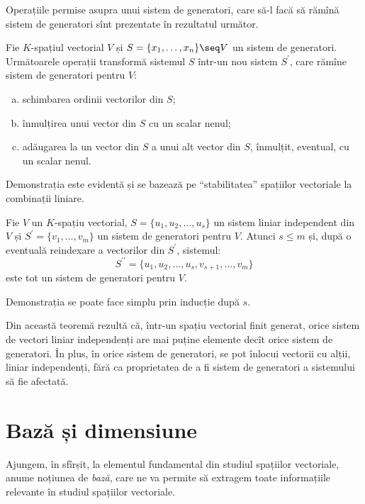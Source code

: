 Operațiile permise asupra unui sistem de generatori, care să-l facă să rămînă 
sistem de generatori sînt prezentate în rezultatul următor.

\begin{proposition}
Fie $K$-spațiul vectorial $V$ și $S = \{x_1, \dots, x_n\} \seq V$ un 
sistem de generatori. Următoarele operații transformă sistemul $S$ într-un nou 
sistem $S^{\prime}$, care rămîne sistem de generatori pentru $V$:
\begin{enumerate}[(a)]
\item schimbarea ordinii vectorilor din $S$;
\item înmulțirea unui vector din $S$ cu un scalar nenul;
\item adăugarea la un vector din $S$ a unui alt vector din $S$, înmulțit, 
eventual, cu un scalar nenul.
\end{enumerate}
\end{proposition}

Demonstrația este evidentă și se bazează pe \enquote{stabilitatea} spațiilor 
vectoriale la combinații liniare.

\begin{theorem}
Fie $V$ un $K$-spațiu vectorial, $S = \{u_1, u_2, \dots, u_s\}$ un sistem 
liniar independent din $V$ și $S^{\prime} = \{v_1, \dots, v_m\}$ un sistem de 
generatori pentru $V$. Atunci $s \leq m$ și, după o eventuală reindexare a 
vectorilor din $S^{\prime}$, sistemul: 
\[
S^{\prime\prime} = \{u_1, u_2, \dots, u_s, v_{s+1}, \dots, v_m\}
\]
este tot un sistem de generatori pentru $V$.
\end{theorem}

Demonstrația se poate face simplu prin inducție după $s$.

Din această teoremă rezultă că, într-un spațiu vectorial finit generat, orice 
sistem de vectori liniar independenți are mai puține elemente decît orice 
sistem de generatori. În plus, în orice sistem de generatori, se pot înlocui 
vectorii cu alții, liniar independenți, fără ca proprietatea de a fi sistem de 
generatori a sistemului să fie afectată.


\section{Bază și dimensiune}

\indent\indent Ajungem, în sfîrșit, la elementul fundamental din studiul 
spațiilor vectoriale, anume noțiunea de \emph{bază}, care ne va permite să 
extragem toate informațiile relevante în studiul spațiilor vectoriale.

